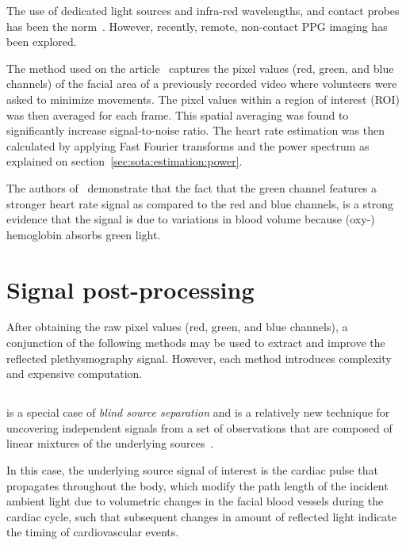 The use of dedicated light sources and infra-red wavelengths, and contact probes
has been the norm~\cite{Ulyanov1993Pulse, Greneker1997Radar, Garbey2007Contact}.
However, recently, remote, non-contact PPG imaging has been explored. %

The method used on the article~\cite{Verkruysse2008Remote} captures the pixel
values (red, green, and blue channels) of the facial area of a previously
recorded video where volunteers were asked to minimize movements. The pixel
values within a region of interest (ROI) was then averaged for each frame.
This spatial averaging was found to significantly increase signal-to-noise
ratio. The heart rate estimation was then calculated by applying Fast Fourier
transforms and the power spectrum as explained on
section~\ref{sec:sota:estimation:power}.

The authors of~\cite{Verkruysse2008Remote} demonstrate that the fact that
the green channel features a stronger heart rate signal as compared to the
red and blue channels, is a strong evidence that the signal is due to
variations in blood volume because (oxy-) hemoglobin absorbs green light.

\section{Signal post-processing} \label{sec:sota:post}

After obtaining the raw pixel values (red, green, and blue channels), a
conjunction of the following methods may be used to extract and improve the
reflected plethysmography signal. However, each method introduces complexity
and expensive computation.

\subsection{\ica} \label{sec:sota:post:ica}

\ica{} is a special case of \emph{blind source separation} and is a relatively
new technique for uncovering independent signals from a set of observations
that are composed of linear mixtures of the underlying
sources~\cite{Comon1994Independent}.

In this case, the underlying source signal of interest is the cardiac pulse
that propagates throughout the body, which modify the path length of the
incident ambient light due to volumetric changes in the facial blood vessels
during the cardiac cycle, such that subsequent changes in amount of reflected
light indicate the timing of cardiovascular events.

